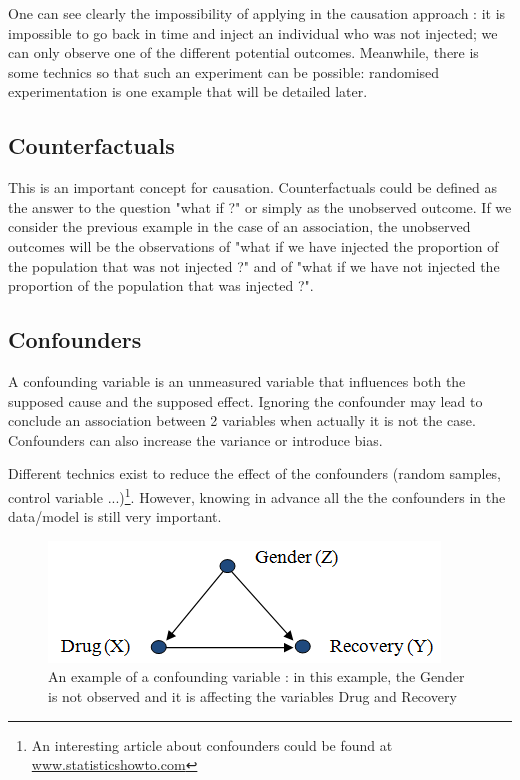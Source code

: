 \documentclass{article}
\begin{document}
One can see clearly the impossibility of applying in the causation approach : it is impossible to go back in time and inject an individual who was not injected; we can only observe one of the different potential outcomes. Meanwhile, there is some technics so that such an experiment can be possible: randomised experimentation is one example that will be detailed later.


\subsection{Counterfactuals}

This is an important concept for causation. Counterfactuals could be defined as the answer to the question "what if ?" or simply as the unobserved outcome. If we consider the previous example in the case of an association, the unobserved outcomes will be the observations of "what if we have injected the proportion of the population that was not injected ?" and of "what if we have not injected the proportion of the population that was injected ?".


\subsection{Confounders}

A confounding variable is an unmeasured variable that influences both the supposed cause and the supposed effect. Ignoring the confounder may lead to conclude an association between 2 variables when actually it is not the case. Confounders can also increase the variance or introduce bias.

Different technics exist to reduce the effect of the confounders (random samples, control variable ...)\footnote{An interesting article about confounders could be found at \href{https://www.statisticshowto.com/experimental-design/confounding-variable/}{www.statisticshowto.com}}. However, knowing in advance all the the confounders in the data/model is still very important.

\begin{figure}[h]
\centering
\includegraphics[width=0.5 \textwidth]{figures/confounding.png}
\caption{An example of a confounding variable : in this example, the Gender is not observed and it is affecting the variables Drug and Recovery}
\end{figure}
\end{document}
